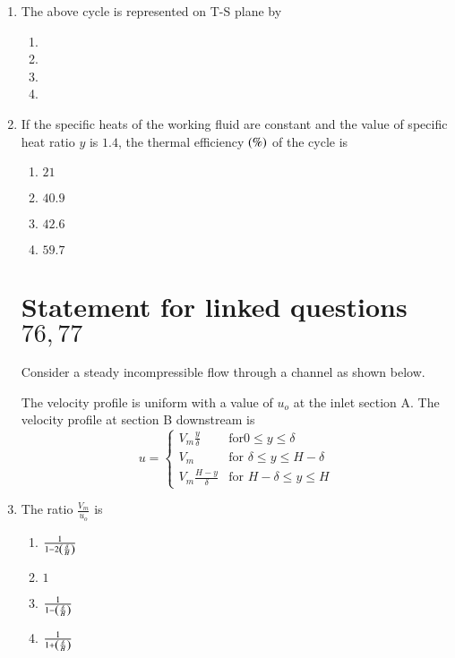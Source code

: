 \documentclass[journal,12pt,twocolumn]{IEEEtran}
\theoremstyle{remark}
\begin{document}
\begin{enumerate}[start=69]
                        \item The above cycle is represented on T-S plane by
                        \begin{enumerate}
                            \item 
                             \item 
                              \item 
                               \item 
                        \end{enumerate}
                          \item If the specific heats of the working fluid are constant and the value of specific heat ratio $y$ is $1.4$, the thermal efficiency $\left(\%\right)$ of the cycle is
                            \begin{enumerate}
                                \item $21$
                                \item $40.9$
                                \item $42.6$
                                \item $59.7$
                            \end{enumerate} 
                        \section{Statement for linked questions $76,77 $}
                        Consider a steady incompressible flow through a channel as shown below.
                        

                        The velocity profile is uniform with a value of $u_o$ at the inlet section A. The velocity profile at section B downstream is
                        $$
                        u = 
                        \begin{cases} 
                        V_m\frac{y}{\delta} & \text{for}  0 \leq y \leq \delta \\ 
                        V_m & \text{for } \delta \leq y \leq H-\delta \\ 
                        V_m\frac{H-y}{\delta} & \text{for } H-\delta \leq y \leq H 
                        \end{cases}
                        $$
                            \item The ratio $\frac{V_m}{u_o}$ is
                            \begin{enumerate}
                                \item $\frac{1}{1 - 2\left(\frac{\delta}{H}\right)}$
                                \item $1$
                                \item $\frac{1}{1 - \left(\frac{\delta}{H}\right)}$
                                \item $\frac{1}{1 + \left(\frac{\delta}{H}\right)}$
                            \end{enumerate}
                            

\end{enumerate}
\end{document}
